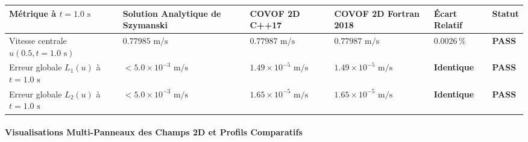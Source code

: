 \documentclass[
  10pt,
]{article}
\newcounter{none} %
\begin{document}
{\def\LTcaptype{none} %
\begin{longtable}[]{@{}
  >{\raggedright\arraybackslash}p{}
  >{\centering\arraybackslash}p{}
  >{\centering\arraybackslash}p{}
  >{\centering\arraybackslash}p{}
  >{\centering\arraybackslash}p{}
  >{\centering\arraybackslash}p{}@{}}
\toprule\noalign{}
\begin{minipage}[b]{\linewidth}\raggedright
Métrique à \(t = 1.0\text{ s}\)
\end{minipage} & \begin{minipage}[b]{\linewidth}\centering
Solution Analytique de Szymanski
\end{minipage} & \begin{minipage}[b]{\linewidth}\centering
COVOF 2D C++17
\end{minipage} & \begin{minipage}[b]{\linewidth}\centering
COVOF 2D Fortran 2018
\end{minipage} & \begin{minipage}[b]{\linewidth}\centering
Écart Relatif
\end{minipage} & \begin{minipage}[b]{\linewidth}\centering
Statut
\end{minipage} \\
\midrule\noalign{}
\endhead
\bottomrule\noalign{}
\endlastfoot
Vitesse centrale \(u(0.5, t=1.0\text{ s})\) & \(0.77985\text{ m/s}\) &
\textbf{\(0.77987\text{ m/s}\)} & \textbf{\(0.77987\text{ m/s}\)} &
\textbf{\(0.0026\,\%\)} & \textbf{PASS} \\
Erreur globale \(L_1(u)\) à \(t=1.0\text{ s}\) &
\(< 5.0 \times 10^{-3}\text{ m/s}\) &
\textbf{\(1.49 \times 10^{-5}\text{ m/s}\)} &
\textbf{\(1.49 \times 10^{-5}\text{ m/s}\)} & \textbf{Identique} &
\textbf{PASS} \\
Erreur globale \(L_2(u)\) à \(t=1.0\text{ s}\) &
\(< 5.0 \times 10^{-3}\text{ m/s}\) &
\textbf{\(1.65 \times 10^{-5}\text{ m/s}\)} &
\textbf{\(1.65 \times 10^{-5}\text{ m/s}\)} & \textbf{Identique} &
\textbf{PASS} \\
\end{longtable}
}

\paragraph{Visualisations Multi-Panneaux des Champs 2D et Profils
Comparatifs}\label{visualisations-multi-panneaux-des-champs-2d-et-profils-comparatifs-2}
\end{document}
